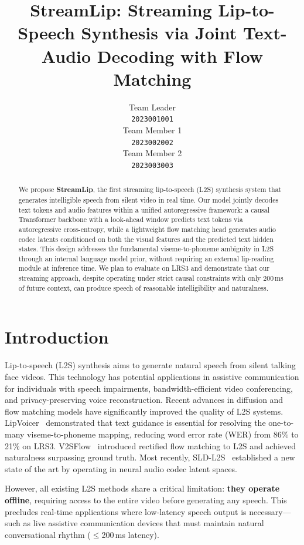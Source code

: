 \documentclass{article}
\title{StreamLip: Streaming Lip-to-Speech Synthesis via Joint Text-Audio Decoding with Flow Matching}
\author{%
  Team Leader \\
  \texttt{2023001001} \\
  \And
  Team Member 1 \\
  \texttt{2023002002} \\
  \And
  Team Member 2 \\
  \texttt{2023003003} \\
}
\begin{document}
\maketitle

\begin{abstract}
We propose \textbf{StreamLip}, the first streaming lip-to-speech (L2S) synthesis system that generates intelligible speech from silent video in real time. Our model jointly decodes text tokens and audio features within a unified autoregressive framework: a causal Transformer backbone with a look-ahead window predicts text tokens via autoregressive cross-entropy, while a lightweight flow matching head generates audio codec latents conditioned on both the visual features and the predicted text hidden states. This design addresses the fundamental viseme-to-phoneme ambiguity in L2S through an internal language model prior, without requiring an external lip-reading module at inference time. We plan to evaluate on LRS3 and demonstrate that our streaming approach, despite operating under strict causal constraints with only 200\,ms of future context, can produce speech of reasonable intelligibility and naturalness.
\end{abstract}

\section{Introduction}

Lip-to-speech (L2S) synthesis aims to generate natural speech from silent talking face videos. This technology has potential applications in assistive communication for individuals with speech impairments, bandwidth-efficient video conferencing, and privacy-preserving voice reconstruction. Recent advances in diffusion and flow matching models have significantly improved the quality of L2S systems. LipVoicer~\cite{lipvoicer} demonstrated that text guidance is essential for resolving the one-to-many viseme-to-phoneme mapping, reducing word error rate (WER) from 86\% to 21\% on LRS3. V2SFlow~\cite{v2sflow} introduced rectified flow matching to L2S and achieved naturalness surpassing ground truth. Most recently, SLD-L2S~\cite{sldl2s} established a new state of the art by operating in neural audio codec latent spaces.

However, all existing L2S methods share a critical limitation: \textbf{they operate offline}, requiring access to the entire video before generating any speech. This precludes real-time applications where low-latency speech output is necessary---such as live assistive communication devices that must maintain natural conversational rhythm ($\leq$200\,ms latency).
\end{document}
